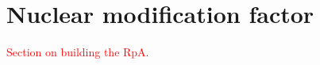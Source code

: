 \section{Nuclear modification factor}
\label{sec:nuclearModFac}

\textcolor{red}{Section on building the RpA.}